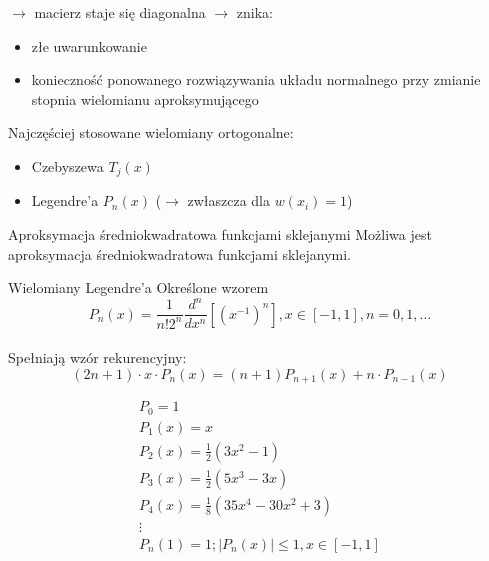 \begin{frame}
	$\rightarrow$ macierz staje się diagonalna $\rightarrow$ znika:
    \begin{itemize}
    \item złe uwarunkowanie
    \item konieczność ponowanego rozwiązywania układu normalnego przy zmianie stopnia wielomianu aproksymującego
    \end{itemize}
	Najczęściej stosowane wielomiany ortogonalne:
    \begin{itemize}
    \item Czebyszewa $T_j(x)$
    \item Legendre'a $P_n(x)$ ($\rightarrow$ zwłaszcza dla $w(x_i) = 1$)
    \end{itemize}
\end{frame}
\begin{frame}{Aproksymacja średniokwadratowa funkcjami sklejanymi}
	Możliwa jest aproksymacja średniokwadratowa funkcjami sklejanymi.
\end{frame}
\begin{frame}{Wielomiany Legendre'a}
	Określone wzorem $$P_n(x) = \frac{1}{n!2^n}\frac{d^n}{dx^n}[(x^{-1})^n],x \in [-1,1], n = 0,1,\ldots$$\\
    Spełniają wzór rekurencyjny:
    $$(2n+1) \cdot x \cdot P_n(x)=(n+1)P_{n+1}(x)+n \cdot P_{n-1}(x)$$
    \begin{flushleft}
    	$$\left.\begin{array}{l}
    P_0 = 1 \\
    P_1(x) = x \\
    P_2(x) = \frac{1}{2}(3x^2-1)\\
    P_3(x) = \frac{1}{2}(5x^3-3x) \\
    P_4(x) = \frac{1}{8}(35x^4-30x^2+3)\\
    \vdots \\
    P_n(1) = 1; |P_n(x)| \leqslant 1, x \in [-1,1]
    \end{array}\right.$$
    \end{flushleft}
\end{frame}

